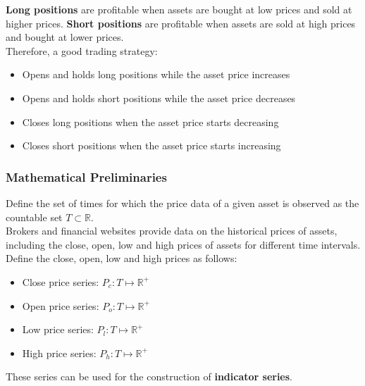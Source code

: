 \documentclass[11pt]{article}
\begin{document}
\textbf{Long positions} are profitable when assets are bought at low prices and sold at higher prices. 
\nolinebreak
\textbf{Short positions} are profitable when assets are sold at high prices and bought at lower prices.\\

Therefore, a good trading strategy:
\begin{itemize}
    \item Opens and holds long positions while the asset price increases
    \item Opens and holds short positions while the asset price decreases
    \item Closes long positions when the asset price starts decreasing
    \item Closes short positions when the asset price starts increasing
\end{itemize}

\subsubsection{Mathematical Preliminaries}

Define the set of times for which the price data of a given asset is observed as the countable set $T \subset \mathbb{R}$.\\

Brokers and financial websites provide data on the historical prices of assets, including the close, open, low and high prices of assets for different time intervals.
\nolinebreak
Define the close, open, low and high prices as follows:
\begin{itemize}
    \item Close price series: $P_{c}:T \mapsto \mathbb{R^{+}}$
    \item Open price series: $P_{o}:T \mapsto \mathbb{R^{+}}$
    \item Low price series: $P_{l}:T \mapsto \mathbb{R^{+}}$
    \item High price series: $P_{h}:T \mapsto \mathbb{R^{+}}$
\end{itemize}

These series can be used for the construction of \textbf{indicator series}.

\end{document}
